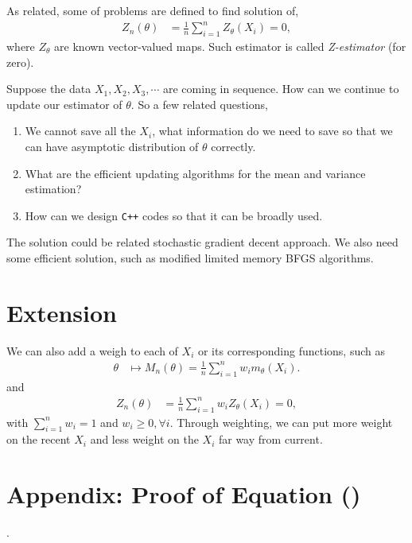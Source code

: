\documentclass[12pt]{article}
\begin{document}
As related, some of problems are defined to find solution of,
\begin{align*}
Z_n(\theta) &= \frac{1}{n} \sum_{i=1}^n Z_{\theta}(X_i)=0,
\end{align*}
where $Z_{\theta}$ are known vector-valued maps.  Such estimator is called \emph{Z-estimator} (for zero). 

Suppose the data $X_1, X_2, X_3, \cdots$ are coming in sequence. How can we continue to update our estimator of $\theta$.  So a few related questions,
\begin{enumerate}
	\item We cannot save all the $X_i$, what information do we need to save so that we can have asymptotic distribution of $\theta$ correctly.
	\item What are the efficient updating algorithms for the mean and variance estimation?
	\item How can we design \texttt{C++} codes so that it can be broadly used.
\end{enumerate}

The solution could be related stochastic gradient decent approach. We also need some efficient solution, such as modified limited memory BFGS algorithms. 


\section{Extension}

We can also add a weigh to each of $X_i$ or its corresponding functions, such as
\begin{align*}
\theta & \mapsto M_n(\theta) = \frac{1}{n} \sum_{i=1}^n w_i m_{\theta} (X_i).
\end{align*} 
and
\begin{align*}
Z_n(\theta) &= \frac{1}{n} \sum_{i=1}^n w_i Z_{\theta}(X_i)=0,
\end{align*}
with $ \sum_{i=1}^n w_i =1$ and $w_i \ge 0, \forall i$.
Through weighting, we can put more weight on the recent $X_i$ and less weight on the $X_i$ far way from current. 

\section*{Appendix: Proof of Equation ()}.






\end{document}
